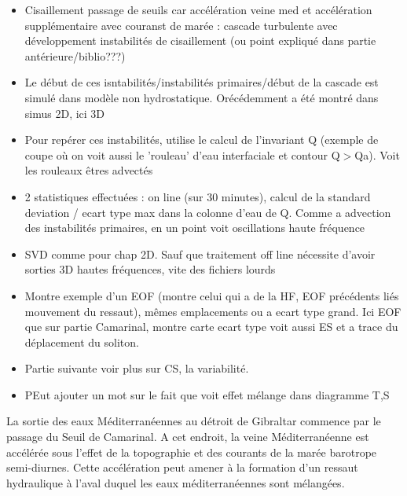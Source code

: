 \begin{itemize}
\item Cisaillement passage de seuils car accélération veine med et accélération supplémentaire avec couranst de marée : cascade turbulente avec développement instabilités de cisaillement (ou point expliqué dans partie antérieure/biblio???)
\item Le début de ces isntabilités/instabilités primaires/début de la cascade est simulé dans modèle non hydrostatique. Orécédemment a été montré dans simus 2D, ici 3D
\item Pour repérer ces instabilités, utilise le calcul de l'invariant Q (exemple de coupe où on voit aussi le 'rouleau' d'eau interfaciale et contour Q$>$Qa). Voit les rouleaux êtres advectés
\item 2 statistiques effectuées : on line (sur 30 minutes), calcul de la standard deviation / ecart type max dans la colonne d'eau de Q. Comme a advection des instabilités primaires, en un point voit oscillations haute fréquence
\item SVD comme pour chap 2D. Sauf que traitement off line nécessite d'avoir sorties 3D hautes fréquences, vite des fichiers lourds
\item Montre exemple d'un EOF (montre celui qui a de la HF, EOF précédents liés mouvement du ressaut), mêmes emplacements ou a ecart type grand. Ici EOF que sur partie Camarinal, montre carte ecart type voit aussi ES et a trace du déplacement du soliton.
\item Partie suivante voir plus sur CS, la variabilité.
\item PEut ajouter un mot sur le fait que voit effet mélange dans diagramme T,S
\end{itemize}

La sortie des eaux Méditerranéennes au détroit de Gibraltar commence par le passage du Seuil de Camarinal. A cet endroit, la veine Méditerranéenne est accélérée sous l'effet de la topographie et des courants de la marée barotrope semi-diurnes. Cette accélération peut amener à la formation d'un ressaut hydraulique à l'aval duquel les eaux méditerranéennes sont mélangées. 

